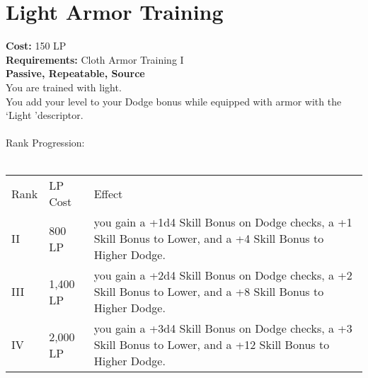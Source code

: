 \section{Light Armor Training}\label{perk:lightArmorTraining}
\textbf{Cost:} 150 LP\\
\textbf{Requirements:} Cloth Armor Training I\\
\textbf{Passive, Repeatable, Source}\\
You are trained with light.\\
You add your level to your Dodge bonus while equipped with armor with the \lq Light \rq descriptor.\\
\\

Rank Progression:\\
\\
\begin{longtable}{l | l | p{9cm}}
	Rank & LP Cost & Effect\\
	II & 800 LP & you gain a +1d4 Skill Bonus on Dodge checks, a +1 Skill Bonus to Lower, and a +4 Skill Bonus to Higher Dodge.\\
	III & 1,400 LP & you gain a +2d4 Skill Bonus on Dodge checks, a +2 Skill Bonus to Lower, and a +8 Skill Bonus to Higher Dodge.\\
	IV & 2,000 LP & you gain a +3d4 Skill Bonus on Dodge checks, a +3 Skill Bonus to Lower, and a +12 Skill Bonus to Higher Dodge.\\
\end{longtable}
